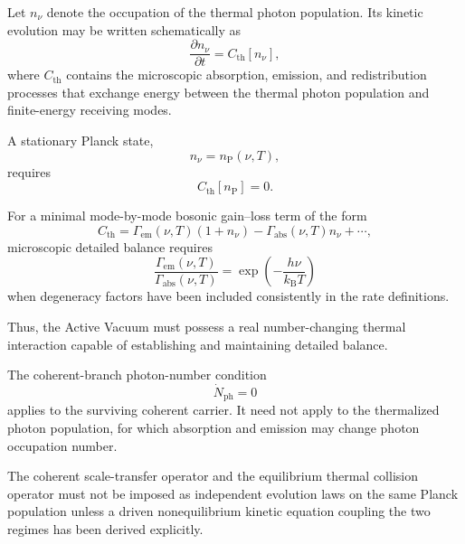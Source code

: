Let \(n_\nu\) denote the occupation of the thermal photon population. Its
kinetic evolution may be written schematically as
\begin{equation}
    \frac{
        \partial n_\nu
    }{
        \partial t
    }
    =
    C_{\mathrm{th}}[n_\nu],
    \label{eq:AR_CMB_transport}
\end{equation}
where \(C_{\mathrm{th}}\) contains the microscopic absorption, emission, and
redistribution processes that exchange energy between the thermal photon
population and finite-energy receiving modes.

A stationary Planck state,
\begin{equation}
    n_\nu
    =
    n_{\mathrm P}(\nu,T),
\end{equation}
requires
\begin{equation}
    C_{\mathrm{th}}[n_{\mathrm P}]
    =
    0.
    \label{eq:AR_CMB_balance}
\end{equation}

For a minimal mode-by-mode bosonic gain--loss term of the form
\begin{equation}
    C_{\mathrm{th}}
    =
    \Gamma_{\mathrm{em}}(\nu,T)
    \left(
        1+n_\nu
    \right)
    -
    \Gamma_{\mathrm{abs}}(\nu,T)
    n_\nu
    +\cdots,
\end{equation}
microscopic detailed balance requires
\begin{equation}
    \frac{
        \Gamma_{\mathrm{em}}(\nu,T)
    }{
        \Gamma_{\mathrm{abs}}(\nu,T)
    }
    =
    \exp
    \left(
        -
        \frac{
            h\nu
        }{
            k_{\mathrm B}T
        }
    \right)
\end{equation}
when degeneracy factors have been included consistently in the rate
definitions.

Thus, the Active Vacuum must possess a real number-changing thermal
interaction capable of establishing and maintaining detailed balance.

The coherent-branch photon-number condition
\begin{equation}
    \dot N_{\mathrm{ph}}
    =
    0
\end{equation}
applies to the surviving coherent carrier. It need not apply to the
thermalized photon population, for which absorption and emission may change
photon occupation number.

The coherent scale-transfer operator and the equilibrium thermal collision
operator must not be imposed as independent evolution laws on the same Planck
population unless a driven nonequilibrium kinetic equation coupling the two
regimes has been derived explicitly.

